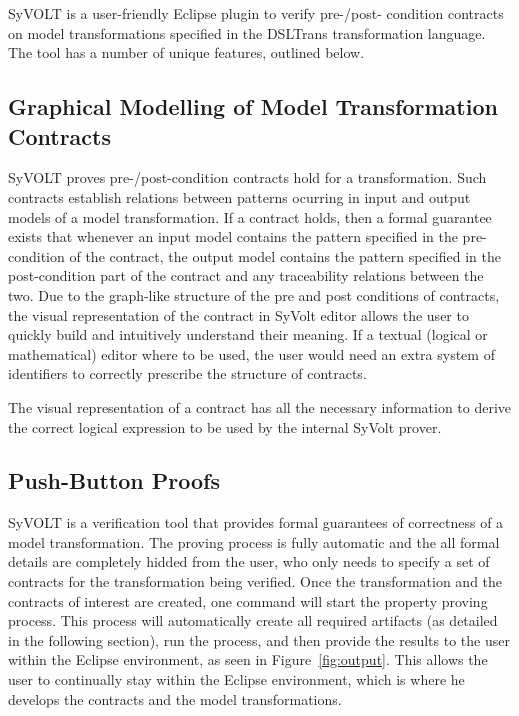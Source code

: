 SyVOLT is a user-friendly Eclipse plugin to verify pre-/post- condition
contracts on model transformations specified in the DSLTrans transformation
language. The tool has a number of unique features, outlined below.

\subsection{Graphical Modelling of Model Transformation Contracts}

SyVOLT proves pre-/post-condition contracts hold for a transformation. Such
contracts establish relations between patterns ocurring in input and output
models of a model transformation. If a contract holds, then a formal guarantee
exists that whenever an input model contains the pattern specified in the
pre-condition of the contract, the output model contains the pattern specified
in the post-condition part of the contract and any traceability relations
between the two. Due to the graph-like structure of the pre and post conditions
of contracts, the visual representation of the contract in SyVolt editor allows
the user to quickly build and intuitively understand their meaning.
If a textual (logical or mathematical) editor where to be used, the user would
need an extra system of identifiers to correctly prescribe the structure of
contracts.

The visual representation of a contract has all the necessary information to derive the correct 
logical expression to be used by the internal SyVolt prover.

\subsection{Push-Button Proofs}
SyVOLT is a verification tool that provides formal guarantees of correctness of
a model transformation. The proving process is fully automatic and the all
formal details are completely hidded from the user, who only needs to specify a
set of contracts for the transformation being verified. Once the transformation and the
contracts of interest are created, one command will start the property proving
process. This process will automatically create all required artifacts (as
detailed in the following section), run the process, and then provide the
results to the user within the Eclipse environment, as seen in
Figure~\ref{fig:output}. This allows the user to continually stay within the
Eclipse environment, which is where he develops the contracts and the model
transformations.

